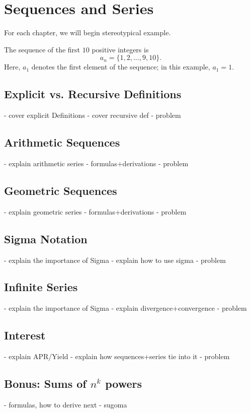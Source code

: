 \chapter{Sequences and Series}

For each chapter, we will begin stereotypical example.
\begin{example}
    The sequence of the first $10$ positive integers is
    \[a_n=\{1,2,\dots,9,10\}.\]
    Here, $a_1$ denotes the first element of the sequence; in this example, $a_1=1$.
\end{example}
\section{Explicit vs. Recursive Definitions}
- cover explicit Definitions
- cover recursive def 
- problem
\section{Arithmetic Sequences}
- explain arithmetic series
- formulas+derivations
- problem
\section{Geometric Sequences}
- explain geometric series
- formulas+derivations
- problem
\section{Sigma Notation}
- explain the importance of Sigma
- explain how to use sigma
- problem
\section{Infinite Series}
- explain the importance of Sigma
- explain divergence+convergence
- problem
\section{Interest}
- explain APR/Yield
- explain how sequences+series tie into it
- problem

\begin{subappendices}
\section{Bonus: Sums of $n^k$ powers}
    - formulas, how to derive next
    - sugoma
\end{subappendices}